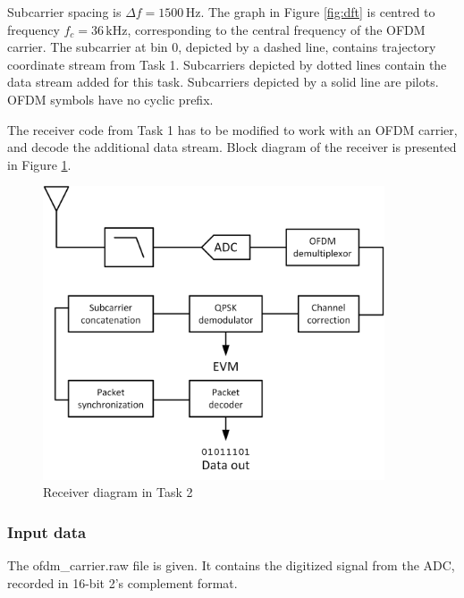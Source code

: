 \documentclass{article}
\begin{document}
Subcarrier spacing is $\varDelta f = 1500 \,\textrm{Hz}$. The graph in Figure \ref{fig:dft} is centred to frequency $f_c = 36 \,\textrm{kHz}$, corresponding to the central frequency of the OFDM carrier. The subcarrier at bin 0, depicted by a dashed line, contains trajectory coordinate stream from Task 1. Subcarriers depicted by dotted lines contain the data stream added for this task. Subcarriers depicted by a solid line are pilots. OFDM symbols have no cyclic prefix.

The receiver code from Task 1 has to be modified to work with an OFDM carrier, and decode the additional data stream. Block diagram of the receiver is presented in Figure \ref{fig:task2}.

\begin{figure}[h!]
\centering
\includegraphics[width=0.9\textwidth]{Images/Task2.png}
\caption{Receiver diagram in Task 2}
\label{fig:task2}
\end{figure}

\subsubsection{Input data}
The \textsf{ofdm\_carrier.raw} file is given. It contains the digitized signal from the ADC, recorded in 16-bit 2's complement format.
\end{document}
